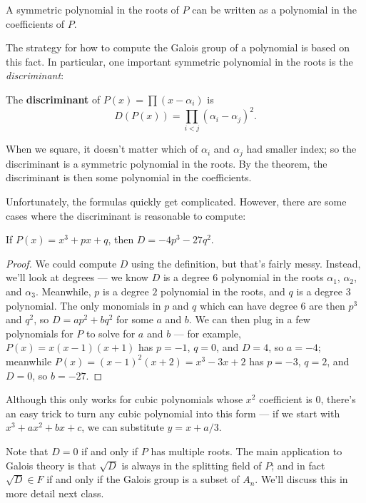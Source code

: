 \begin{corollary}
    A symmetric polynomial in the roots of $P$ can be written as a polynomial in the coefficients of $P$. 
\end{corollary}

The strategy for how to compute the Galois group of a polynomial is based on this fact. In particular, one important symmetric polynomial in the roots is the \emph{discriminant}:

\begin{definition}
    The \textbf{discriminant} of $P(x) = \prod(x - \alpha_i)$ is \[D(P(x)) = \prod_{i < j} (\alpha_i - \alpha_j)^2.\] 
\end{definition}

When we square, it doesn't matter which of $\alpha_i$ and $\alpha_j$ had smaller index; so the discriminant is a symmetric polynomial in the roots. By the theorem, the discriminant is then some polynomial in the coefficients. 

Unfortunately, the formulas quickly get complicated. However, there are some cases where the discriminant is reasonable to compute:

\begin{example}
    If $P(x) = x^3 + px + q$, then $D = -4p^3 - 27q^2$.
\end{example}

\begin{proof}
We could compute $D$ using the definition, but that's fairly messy. Instead, we'll look at degrees --- we know $D$ is a degree $6$ polynomial in the roots $\alpha_1$, $\alpha_2$, and $\alpha_3$. Meanwhile, $p$ is a degree $2$ polynomial in the roots, and $q$ is a degree $3$ polynomial. The only monomials in $p$ and $q$ which can have degree $6$ are then $p^3$ and $q^2$, so $D = ap^2 + bq^2$ for some $a$ and $b$. We can then plug in a few polynomials for $P$ to solve for $a$ and $b$ --- for example, $P(x) = x(x - 1)(x + 1)$ has $p = -1$, $q = 0$, and $D = 4$, so $a = -4$; meanwhile $P(x) = (x - 1)^2(x + 2) = x^3 - 3x + 2$ has $p = -3$, $q = 2$, and $D = 0$, so $b = -27$. 
\end{proof}

Although this only works for cubic polynomials whose $x^2$ coefficient is $0$, there's an easy trick to turn any cubic polynomial into this form --- if we start with $x^3 + ax^2 + bx + c$, we can substitute $y = x + a/3$. 

Note that $D = 0$ if and only if $P$ has multiple roots. The main application to Galois theory is that $\sqrt{D}$ is always in the splitting field of $P$; and in fact $\sqrt{D} \in F$ if and only if the Galois group is a subset of $A_n.$ We'll discuss this in more detail next class.